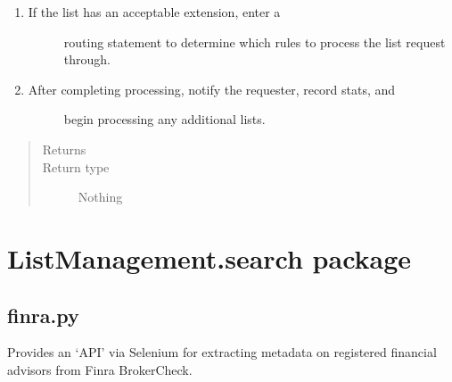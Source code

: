 \documentclass[letterpaper,10pt,english]{sphinxmanual}
\begin{document}
\begin{fulllineitems}
\begin{fulllineitems}
\begin{description}
\begin{enumerate}
\begin{description}
\begin{description}
\end{description}

\end{description}

\item {} \begin{description}
\item[{If the list has an acceptable extension, enter a}] \leavevmode
routing statement to determine which rules to process the list request
through.

\end{description}

\item {} \begin{description}
\item[{After completing processing, notify the requester, record stats, and}] \leavevmode
begin processing any additional lists.

\end{description}

\end{enumerate}

\end{description}
\begin{quote}\begin{description}
\item[{Returns}] \leavevmode


\item[{Return type}] \leavevmode
Nothing

\end{description}\end{quote}

\end{fulllineitems}


\end{fulllineitems}



\chapter{ListManagement.search package}
\label{\detokenize{index:module-ListManagement.search}}\label{\detokenize{index:listmanagement-search-package}}\label{\detokenize{index:module-ListManagement.search.finra}}

\section{finra.py}
\label{\detokenize{index:finra-py}}
Provides an ‘API’ via Selenium for extracting metadata
on registered financial advisors from Finra BrokerCheck.
\end{document}
